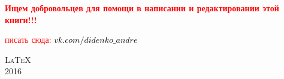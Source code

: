 \mbox{}

\textcolor{red}{\Large \textbf{
Ищем добровольцев для помощи в написании и редактировании этой книги!!!}}

\mbox{}

\textcolor{red}{
 писать сюда: \href{https://vk.com/didenko_andre}{\textcolor{black}{ \textcolor{Purplemountainmajesty}{$vk.com/didenko\_andre$}}}
}

\mbox{}

\vfill
{\LARGE\scshape \LaTeX}\\[\baselineskip]
{\LARGE\scshape 2016}\par
\restoregeometry
\endgroup
